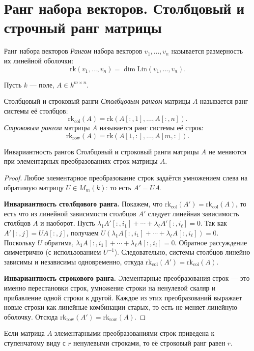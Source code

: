 
\section{Ранг набора векторов. Столбцовый и строчный ранг матрицы}

\begin{Definition}{Ранг набора векторов}{}
	\emph{Рангом} набора векторов $v_1, \ldots, v_n$ называется размерность их линейной оболочки:
	\[
	\mathrm{rk}(v_1, \ldots, v_n) = \dim \mathrm{Lin}(v_1, \ldots, v_n).
	\]
\end{Definition}

Пусть $k$ — поле, $A \in k^{m \times n}$.

\begin{Definition}{Столбцовый и строковый ранги}{}
	\emph{Столбцовым рангом} матрицы $A$ называется ранг системы её столбцов:
	\[
	\mathrm{rk}_{\mathrm{col}}(A) = \mathrm{rk}(A[{:},1], \ldots, A[{:},n]).
	\]
	\emph{Строковым рангом} матрицы $A$ называется ранг системы её строк:
	\[
	\mathrm{rk}_{\mathrm{row}}(A) = \mathrm{rk}(A[1,{:}], \ldots, A[m,{:}]).
	\]
\end{Definition}

\begin{Statement}{Инвариантность рангов}{}
	Столбцовый и строковый ранги матрицы $A$ не меняются при элементарных преобразованиях строк матрицы $A$.
\end{Statement}

\begin{proof}
	Любое элементарное преобразование строк задаётся умножением слева на обратимую матрицу $U \in M_m(k)$: то есть $A' = UA$.
	
	\textbf{Инвариантность столбцового ранга.} Покажем, что $\mathrm{rk}_{\mathrm{col}}(A') = \mathrm{rk}_{\mathrm{col}}(A)$, то есть что из линейной зависимости столбцов $A'$ следует линейная зависимость столбцов $A$ и наоборот.
	Пусть $\lambda_1 A'[{:},i_1] + \cdots + \lambda_\ell A'[{:},i_\ell] = 0$.
	Так как $A'[{:},j] = UA[{:},j]$, получаем $U(\lambda_1 A[{:},i_1] + \cdots + \lambda_\ell A[{:},i_\ell]) = 0$.
	Поскольку $U$ обратима, $\lambda_1 A[{:},i_1] + \cdots + \lambda_\ell A[{:},i_\ell] = 0$. Обратное рассуждение симметрично (с использованием $U^{-1}$).
	Следовательно, системы столбцов линейно зависимы и независимы одновременно, откуда $\mathrm{rk}_{\mathrm{col}}(A') = \mathrm{rk}_{\mathrm{col}}(A)$.
	
	\textbf{Инвариантность строкового ранга.} Элементарные преобразования строк — это именно перестановки строк, умножение строки на ненулевой скаляр и прибавление одной строки к другой.
	Каждое из этих преобразований выражает новые строки как линейные комбинации старых, то есть не меняет линейную оболочку. Отсюда $\mathrm{rk}_{\mathrm{row}}(A') = \mathrm{rk}_{\mathrm{row}}(A)$.
\end{proof}

\begin{Remark}{}{}
	Если матрица $A$ элементарными преобразованиями строк приведена к ступенчатому виду с $r$ ненулевыми строками, то её строковый ранг равен $r$.
\end{Remark}
